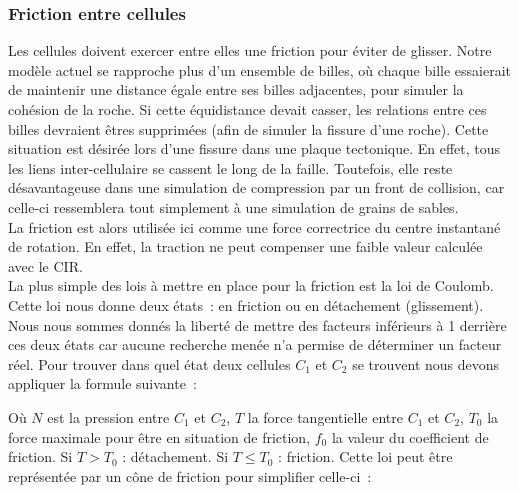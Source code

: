 \documentclass[a4paper,11pt]{article}
\begin{document}
\subsubsection{Friction entre cellules}
Les cellules doivent exercer entre elles une friction pour éviter de glisser.
Notre modèle actuel se rapproche plus d'un ensemble de billes, où chaque bille essaierait de maintenir une distance égale entre ses billes adjacentes, pour simuler la cohésion de la roche.
Si cette équidistance devait casser, les relations entre ces billes devraient êtres supprimées (afin de simuler la fissure d'une roche).
Cette situation est désirée lors d'une fissure dans une plaque tectonique. En effet, tous les liens inter-cellulaire se cassent le long de la faille. Toutefois, elle reste désavantageuse dans une simulation de compression par un front de collision, car celle-ci ressemblera tout simplement à une simulation de grains de sables.\\
La friction est alors utilisée ici comme une force correctrice du centre instantané de rotation. En effet, la traction ne peut compenser une faible valeur calculée avec le CIR. \\
La plus simple des lois à mettre en place pour la friction est la loi de Coulomb.
Cette loi nous donne deux états~: en friction ou en détachement (glissement). Nous nous sommes donnés la liberté de mettre des facteurs inférieurs à 1 derrière ces deux états car aucune recherche menée n'a permise de déterminer un facteur réel.
Pour trouver dans quel état deux cellules $C_1$ et $C_2$ se trouvent nous devons appliquer la formule suivante~:
\begin{center}
\end{center}
\bigbreak
Où $N$ est la pression entre $C_1$ et $C_2$, $T$ la force tangentielle entre $C_1$ et $C_2$, $T_0$ la force maximale pour être en situation de friction, $f_0$ la valeur du coefficient de friction.
\medbreak
Si $T > T_0$ : détachement.
Si $T \leqslant T_0$ : friction.
\medbreak
Cette loi peut être représentée par un cône de friction pour simplifier celle-ci~: \\

\begin{center}
\end{center}
\end{document}
